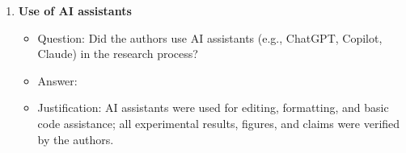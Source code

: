 \documentclass{article}
\begin{document}
\begin{enumerate}
\item {\bf Use of AI assistants}
    \begin{itemize}
        \item[] Question: Did the authors use AI assistants (e.g., ChatGPT, Copilot, Claude) in the research process?
        \item[] Answer: \answerYes{}
        \item[] Justification: AI assistants were used for editing, formatting, and basic code assistance; all experimental results, figures, and claims were verified by the authors.
    \end{itemize}

\end{enumerate}

\newpage
\appendix










\end{document}
